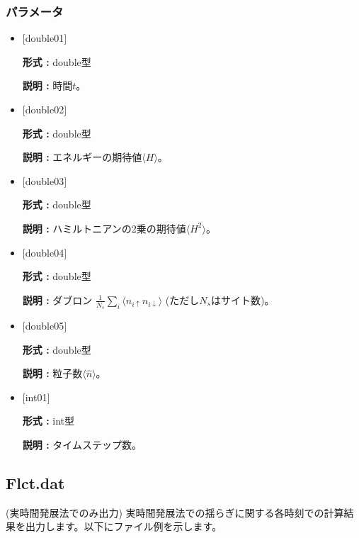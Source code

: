 \subsubsection{パラメータ}
 \begin{itemize}

  \item  $[$double01$]$
  
 {\bf 形式 :} double型

{\bf 説明 :} 時間$t$。
 
  \item $[$double02$]$

 {\bf 形式 :} double型 

{\bf 説明 :}  エネルギーの期待値$\langle H \rangle$。

  \item $[$double03$]$

 {\bf 形式 :} double型 

{\bf 説明 :} ハミルトニアンの2乗の期待値$\langle H^2 \rangle$。

  \item $[$double04$]$

 {\bf 形式 :} double型 

{\bf 説明 :} ダブロン
$\frac{1}{N_s} \sum_{i}\langle n_{i\uparrow}n_{i\downarrow}\rangle$ (ただし$N_s$はサイト数)。

  \item $[$double05$]$

 {\bf 形式 :} double型 

{\bf 説明 :} 粒子数$\langle {\hat n} \rangle$。


  \item $[$int01$]$

 {\bf 形式 :} int型 

{\bf 説明 :} タイムステップ数。

 \end{itemize}

\newpage
\subsection{{Flct.dat}}
\label{Subsec:flctrand}
(実時間発展法でのみ出力) 実時間発展法での揺らぎに関する各時刻での計算結果を出力します。以下にファイル例を示します。\\

